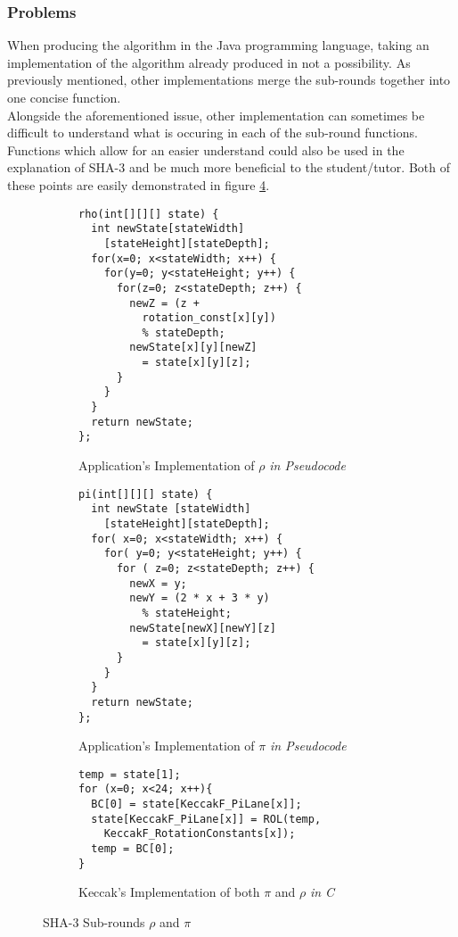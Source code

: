 \subsubsection{Problems}
When producing the algorithm in the Java programming language, taking an implementation of the algorithm already produced in not a possibility. As previously mentioned, other implementations merge the sub-rounds together into one concise function.
\vspace{5mm}\\
Alongside the aforementioned issue, other implementation can sometimes be difficult to understand what is occuring in each of the sub-round functions. Functions which allow for an easier understand could also be used in the explanation of SHA-3 and be much more beneficial to the student/tutor. Both of these points are easily demonstrated in figure \ref{fig:RhoPi}.
\begin{figure}[h!]
\advance\leftskip-2cm
\begin{subfigure}{.6\textwidth}
    \begin{lstlisting}
rho(int[][][] state) {
  int newState[stateWidth]
    [stateHeight][stateDepth];
  for(x=0; x<stateWidth; x++) {
    for(y=0; y<stateHeight; y++) {
      for(z=0; z<stateDepth; z++) {
        newZ = (z +
          rotation_const[x][y])
          % stateDepth;
        newState[x][y][newZ]
          = state[x][y][z];
      }
    }
  }
  return newState;
};
    \end{lstlisting}
    \caption{Application's Implementation of $\rho$ \emph{in Pseudocode}}
    \label{fig:sub1RhoP}
\end{subfigure}
\advance\rightskip-2cm
\hfill\begin{subfigure}{.6\textwidth}
    \begin{lstlisting}
pi(int[][][] state) {
  int newState [stateWidth]
    [stateHeight][stateDepth];
  for( x=0; x<stateWidth; x++) {
    for( y=0; y<stateHeight; y++) {
      for ( z=0; z<stateDepth; z++) {
        newX = y;
        newY = (2 * x + 3 * y)
          % stateHeight;
        newState[newX][newY][z]
          = state[x][y][z];
      }
    }
  }
  return newState;
};
    \end{lstlisting}
    \caption{Application's Implementation of $\pi$ \emph{in Pseudocode}}
    \label{fig:sub2RhoPi}
\end{subfigure}
\begin{center}
\begin{subfigure}{.6\textwidth}
\centering
\begin{lstlisting}
temp = state[1];
for (x=0; x<24; x++){
  BC[0] = state[KeccakF_PiLane[x]];
  state[KeccakF_PiLane[x]] = ROL(temp,
    KeccakF_RotationConstants[x]);
  temp = BC[0];
}
    \end{lstlisting}
    \caption{Keccak's Implementation of both $\pi$ and $\rho$ \emph{in C}}
    \label{fig:sub3RhoP}
\end{subfigure}
\end{center}
\caption{SHA-3 Sub-rounds $\rho$ and $\pi$}
\label{fig:RhoPi}
\end{figure}
